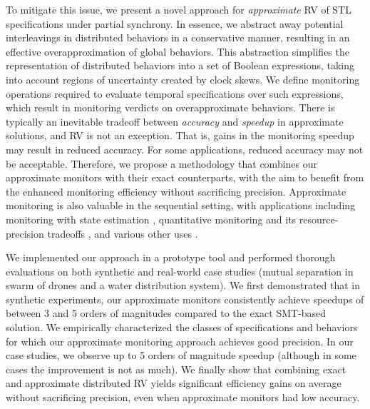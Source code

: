 To mitigate this issue, we present a novel approach for \emph{approximate} RV of STL 
specifications under partial synchrony.
%
In essence, we abstract away potential interleavings in distributed behaviors in a conservative 
manner, resulting in an effective overapproximation of global behaviors.
%
This abstraction simplifies the representation of distributed behaviors into a set of Boolean 
expressions, taking into account regions of uncertainty created by clock skews.
%
We define monitoring operations required to evaluate temporal specifications over such expressions, 
which result in monitoring verdicts on overapproximate behaviors.
%
There is typically an inevitable tradeoff between {\em accuracy} and {\em speedup} in approximate 
solutions, and  RV is not an exception.
%
That is, gains in the monitoring speedup may result in reduced accuracy.
%
For some applications, reduced accuracy may not be acceptable.
%
Therefore, we propose a methodology that combines our approximate monitors with their exact 
counterparts, with the aim to benefit from the enhanced monitoring efficiency without sacrificing 
precision.
%
Approximate monitoring is also valuable in the sequential setting, with applications including
monitoring with state estimation \cite{StollerBSGHSZ11,BartocciG13},
quantitative monitoring and its resource-precision tradeoffs \cite{HenzingerS21,HenzingerMS22,HenzingerMS23},
and various other uses \cite{AlechinaDL14,AcetoAFIL21}.



We implemented our approach in a prototype tool and performed thorough evaluations on both 
synthetic and real-world case studies (mutual separation in swarm of drones and a water distribution 
system).
%
We first demonstrated that in synthetic experiments, our approximate monitors consistently achieve 
speedups of between 3 and 5 orders of magnitudes compared to the exact SMT-based solution.
%
We empirically characterized the classes of specifications and behaviors for which our approximate 
monitoring approach achieves good precision.
%
In our case studies, we observe up to 5 orders of magnitude speedup (although in some cases the 
improvement is not as much).
%
We finally show that combining exact and approximate distributed RV yields significant efficiency gains on average without sacrificing precision, even when approximate monitors had low accuracy.

